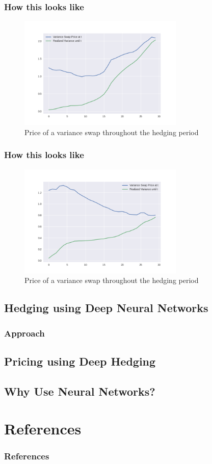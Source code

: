 \documentclass[serif]{beamer}
\begin{document}
\begin{frame}
    \frametitle{How this looks like}
    \begin{figure}
        \includegraphics[width=0.7\textwidth]{./images/var_swap_price1.png}
        \caption{
            Price of a variance swap throughout the hedging period
        }
    \end{figure}
\end{frame}

\begin{frame}
    \frametitle{How this looks like}
    \begin{figure}
        \includegraphics[width=0.7\textwidth]{./images/var_swap_price.png}
        \caption{
            Price of a variance swap throughout the hedging period
        }
    \end{figure}
\end{frame}

\subsection{Hedging using Deep Neural Networks}

\begin{frame}
    \frametitle{Approach}
\end{frame}

\subsection{Pricing using Deep Hedging}
\subsection{Why Use Neural Networks?}

\section{References}
\begin{frame}
    \frametitle{References}
    
    
\end{frame}
\end{document}
